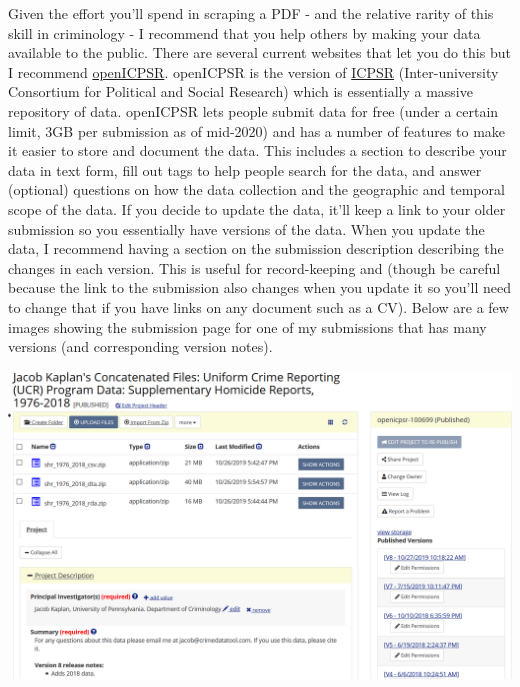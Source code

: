 \documentclass[
  12pt,
]{book}
\begin{document}
Given the effort you'll spend in scraping a PDF - and the relative rarity of this skill in criminology - I recommend that you help others by making your data available to the public. There are several current websites that let you do this but I recommend \href{https://www.icpsr.umich.edu/web/pages/NACJD/index.html}{openICPSR}. openICPSR is the version of \href{https://www.icpsr.umich.edu/web/pages/}{ICPSR} (Inter-university Consortium for Political and Social Research) which is essentially a massive repository of data. openICPSR lets people submit data for free (under a certain limit, 3GB per submission as of mid-2020) and has a number of features to make it easier to store and document the data. This includes a section to describe your data in text form, fill out tags to help people search for the data, and answer (optional) questions on how the data collection and the geographic and temporal scope of the data. If you decide to update the data, it'll keep a link to your older submission so you essentially have versions of the data. When you update the data, I recommend having a section on the submission description describing the changes in each version. This is useful for record-keeping and (though be careful because the link to the submission also changes when you update it so you'll need to change that if you have links on any document such as a CV). Below are a few images showing the submission page for one of my submissions that has many versions (and corresponding version notes).

\includegraphics{images/openICPSR1.PNG}
\end{document}
